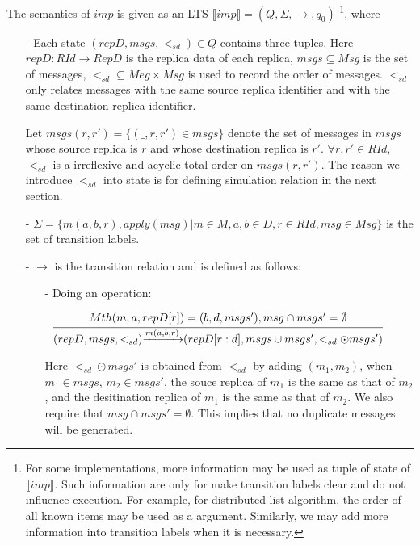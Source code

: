 The semantics of $imp$ is given as an LTS $\llbracket imp \rrbracket = (Q,\Sigma,\rightarrow,q_0)$ \footnote{{\color {red} For some implementations, more information may be used as tuple of state of $\llbracket imp \rrbracket$. Such information are only for make transition labels clear and do not influence execution. For example, for distributed list algorithm, the order of all known items may be used as a argument. Similarly, we may add more information into transition labels when it is necessary.}}, where

\begin{itemize}
\setlength{\itemsep}{0.5pt}
\item[-] Each state $(repD,msgs,<_{sd}) \in Q$ contains three tuples. Here $repD: RId \rightarrow RepD$ is the replica data of each replica, $msgs \subseteq Msg$ is the set of messages, $<_{sd} \subseteq Meg \times Msg$ is used to record the order of messages. $<_{sd}$ only relates messages with the same source replica identifier and with the same destination replica identifier.

Let $msgs(r,r') = \{ (\_,r,r') \in msgs \}$ denote the set of messages in $msgs$ whose source replica is $r$ and whose destination replica is $r'$. $\forall r,r' \in RId$, $<_{sd}$ is a irreflexive and acyclic total order on $msgs(r,r')$. %
The reason we introduce $<_{sd}$ into state is for defining simulation relation in the next section.

\item[-] $\Sigma = \{ m(a,b,r), apply(msg) \vert m \in M, a,b \in D, r \in RId, msg \in Msg \}$ is the set of transition labels.

\item[-] $\rightarrow$ is the transition relation and is defined as follows:

    \begin{itemize}
    \setlength{\itemsep}{0.5pt}
    \item[-] Doing an operation:

    $\begin{array}{l c} \bigfrac{ Mth(m,a,repD[r]) = (b,d,msgs'), msg \cap msgs' = \emptyset} {(repD,msgs,<_{sd}) {\xrightarrow{m(a,b,r)}} (repD[r:d],msgs \cup msgs',<_{sd} \odot msgs')} \end{array}$
    
    Here $<_{sd} \odot msgs'$ is obtained from $<_{sd}$ by adding  $(m_1,m_2)$, when $m_1 \in msgs$, $m_2 \in msgs'$, the souce replica of $m_1$ is the same as that of $m_2$, and the desitination replica of $m_1$ is the same as that of $m_2$. {\color {red} We also require that $msg \cap msgs' = \emptyset$. This implies that no duplicate messages will be generated.} 


\end{itemize}
\end{itemize}
